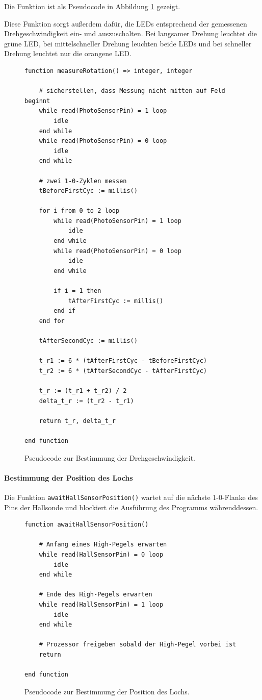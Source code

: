 \documentclass{kis}
\begin{document}
Die Funktion ist als Pseudocode in Abbildung \ref{fig:pseudo-dreh} gezeigt.

Diese Funktion sorgt außerdem dafür, die LEDs entsprechend der gemessenen Drehgeschwindigkeit ein- und auszuschalten. Bei langsamer Drehung leuchtet die grüne LED, bei mittelschneller Drehung leuchten beide LEDs und bei schneller Drehung leuchtet nur die orangene LED.

\begin{figure}
\lstset{basicstyle=\small\ttfamily,tabsize=4}
{\singlespacing
\begin{lstlisting}[frame=single]
function measureRotation() => integer, integer

	# sicherstellen, dass Messung nicht mitten auf Feld beginnt
	while read(PhotoSensorPin) = 1 loop
		idle
	end while
	while read(PhotoSensorPin) = 0 loop
		idle
	end while

	# zwei 1-0-Zyklen messen
	tBeforeFirstCyc := millis()

	for i from 0 to 2 loop
		while read(PhotoSensorPin) = 1 loop
			idle
		end while
		while read(PhotoSensorPin) = 0 loop
			idle
		end while
		
		if i = 1 then
			tAfterFirstCyc := millis()
		end if
	end for	
	
	tAfterSecondCyc := millis()
	
	t_r1 := 6 * (tAfterFirstCyc - tBeforeFirstCyc)
	t_r2 := 6 * (tAfterSecondCyc - tAfterFirstCyc)
	
	t_r := (t_r1 + t_r2) / 2
	delta_t_r := (t_r2 - t_r1)
	
	return t_r, delta_t_r
	
end function
\end{lstlisting}
}
\caption{Pseudocode zur Bestimmung der Drehgeschwindigkeit.}
\label{fig:pseudo-dreh}
\end{figure}

\paragraph{Bestimmung der Position des Lochs}
Die Funktion \texttt{awaitHallSensorPosition()} wartet auf die nächste 1-0-Flanke des Pins der Hallsonde und blockiert die Ausführung des Programms währenddessen. 

\begin{figure}
\lstset{basicstyle=\small\ttfamily,tabsize=3}
{\singlespacing
\begin{lstlisting}[frame=single]
function awaitHallSensorPosition()

	# Anfang eines High-Pegels erwarten
	while read(HallSensorPin) = 0 loop
		idle
	end while
	
	# Ende des High-Pegels erwarten
	while read(HallSensorPin) = 1 loop
		idle
	end while
	
	# Prozessor freigeben sobald der High-Pegel vorbei ist
	return
	
end function
\end{lstlisting}
}
\caption{Pseudocode zur Bestimmung der Position des Lochs.}
\label{fig:pseudo-loch}
\end{figure}
\end{document}
